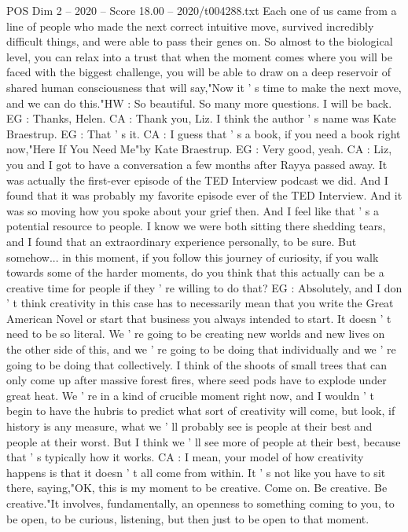\begin{textsample}{POS Dim 2 – 2020 – Score 18.00 – 2020/t004288.txt}
Each one of us came from a line of people who made the next correct intuitive move, survived incredibly difficult things, and were able to pass their genes on.
So almost to the biological level, you can relax into a trust that when the moment comes where you will be faced with the biggest challenge, you will be able to draw on a deep reservoir of shared human consciousness that will say,"Now it ' s time to make the next move, and we can do this."HW : So beautiful.
So many more questions.
I will be back.
EG : Thanks, Helen.
CA : Thank you, Liz.
I think the author ' s name was Kate Braestrup.
EG : That ' s it.
CA : I guess that ' s a book, if you need a book right now,"Here If You Need Me"by Kate Braestrup.
EG : Very good, yeah.
CA : Liz, you and I got to have a conversation a few months after Rayya passed away.
It was actually the first-ever episode of the TED Interview podcast we did.
And I found that it was probably my favorite episode ever of the TED Interview.
And it was so moving how you spoke about your grief then.
And I feel like that ' s a potential resource to people.
I know we were both sitting there shedding tears, and I found that an extraordinary experience personally, to be sure.
But somehow... in this moment, if you follow this journey of curiosity, if you walk towards some of the harder moments, do you think that this actually can be a creative time for people if they ' re willing to do that?
EG : Absolutely, and I don ' t think creativity in this case has to necessarily mean that you write the Great American Novel or start that business you always intended to start.
It doesn ' t need to be so literal.
We ' re going to be creating new worlds and new lives on the other side of this, and we ' re going to be doing that individually and we ' re going to be doing that collectively.
I think of the shoots of small trees that can only come up after massive forest fires, where seed pods have to explode under great heat.
We ' re in a kind of crucible moment right now, and I wouldn ' t begin to have the hubris to predict what sort of creativity will come, but look, if history is any measure, what we ' ll probably see is people at their best and people at their worst.
But I think we ' ll see more of people at their best, because that ' s typically how it works.
CA : I mean, your model of how creativity happens is that it doesn ' t all come from within.
It ' s not like you have to sit there, saying,"OK, this is my moment to be creative.
Come on.
Be creative.
Be creative."It involves, fundamentally, an openness to something coming to you, to be open, to be curious, listening, but then just to be open to that moment.

\end{textsample}
